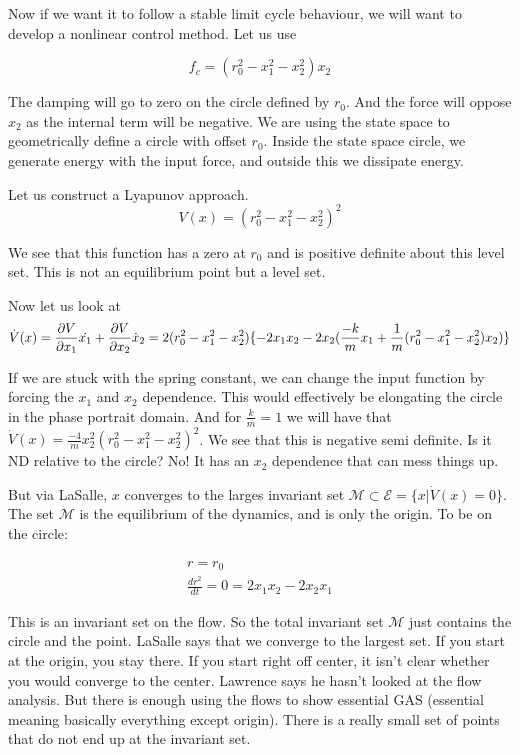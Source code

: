 \documentclass[11pt]{article}
\begin{document}
Now if we want it to follow a stable limit cycle behaviour, we will want to develop a nonlinear control method. Let us use

\begin{equation}
	f_c = (r_0^2 - x_1^2 -x_2^2)x_2
\end{equation}

The damping will go to zero on the circle defined by $r_0$. And the force will oppose $x_2$ as the internal term will be negative. We are using the state space to geometrically define a circle with offset $r_0$. Inside the state space circle, we generate energy with the input force, and outside this we dissipate energy. 

Let us construct a Lyapunov approach. 
\begin{equation}
	V(x) = (r_0^2 - x_1^2 -x_2^2)^2
\end{equation}

We see that this function has a zero at $r_0$ and is positive definite about this level set. This is not an equilibrium point but a level set. 

Now let us look at
\begin{equation}
	\dot{V}(x) = \frac{\partial V}{\partial x_1}\dot{x_1} + \frac{\partial V}{\partial x_2}\dot{x}_2 = \\
	2(r_0^2 - x_1^2 -x_2^2) \{ -2x_1x_2 - 2x_2(\frac{-k}{m}x_1 + \frac{1}{m}(r_0^2 - x_1^2 -x_2^2)x_2) \}
\end{equation}

If we are stuck with the spring constant, we can change the input function by forcing the $x_1$ and $x_2$ dependence. This would effectively be elongating the circle in the phase portrait domain. And for $\frac{k}{m} = 1$ we will have that $\dot{V}(x) = \frac{-4}{m}x_2^2(r_0^2 - x_1^2 -x_2^2)^2$. We see that this is negative semi definite. Is it ND relative to the circle? No! It has an $x_2$ dependence that can mess things up. 

But via LaSalle, $x$ converges to the larges invariant set $\mathcal{M} \subset \mathcal{E} = \{  x \rvert \dot{V}(x) = 0 \}$. The set $\mathcal{M}$ is the equilibrium of the dynamics, and is only the origin. To be on the circle:

\begin{align}
r = r_0 \\
\frac{d r^2}{dt} = 0  = 2x_1x_2 - 2x_2x_1
\end{align}

This is an invariant set on the flow. So the total invariant set $\mathcal{M}$ just contains the circle and the point. LaSalle says that we converge to the largest set. If you start at the origin, you stay there. If you start right off center, it isn't clear whether you would converge to the center. Lawrence says he hasn't looked at the flow analysis. But there is enough using the flows to show essential GAS (essential meaning basically everything except origin). There is a really small set of points that do not end up at the invariant set.
\end{document}
